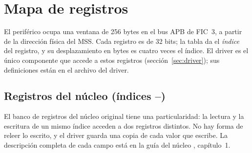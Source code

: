 \chapter{Mapa de registros}
\label{anx:registros}

El periférico ocupa una ventana de 256 bytes en el bus APB de FIC~3, a partir
de la dirección física  del MSS. Cada registro es de 32
bits; la tabla da el \emph{índice} del registro, y su desplazamiento en
bytes es cuatro veces el índice. El driver es el único componente que
accede a estos registros (sección~\ref{sec:driver}); sus definiciones están
en el archivo  del driver.

\section{Registros del núcleo (índices --)}

El banco de registros del núcleo original tiene una particularidad: la
lectura y la escritura de un mismo índice acceden a dos registros distintos.
No hay forma de releer lo escrito, y el driver guarda una copia de cada valor
que escribe. La descripción completa de cada campo está en la guía del
núcleo \citep{De_Vleeschauwer_2017}, capítulo~1.

